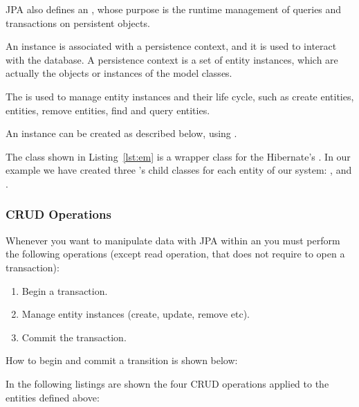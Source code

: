 JPA also defines an , whose purpose is the runtime
management of queries and transactions on persistent objects.

An  instance is associated with a persistence context, and
it is used to interact with the database. A persistence context is a set of
entity instances, which are actually the objects or instances of the model
classes.

The  is used to manage entity instances and their life
cycle, such as create entities, entities, remove entities, find and query
entities.

An  instance can be created as described below, using
.



The class shown in Listing~\ref{lst:em} is a wrapper class for the Hibernate's
. In our example we have created three
's child classes for each entity of our system:
,  and .

\subsubsection{CRUD Operations}

Whenever you want to manipulate data with JPA within an  you
must perform the following operations (except read operation, that does not
require to open a transaction):

\begin{enumerate}
	\item Begin a transaction.
	\item Manage entity instances (create, update, remove etc).
	\item Commit the transaction.
\end{enumerate}

How to begin and commit a transition is shown below:





In the following listings are shown the four CRUD operations applied to the
entities defined above:

